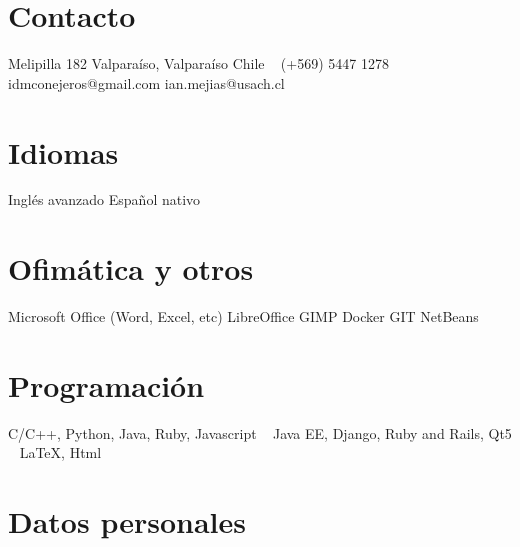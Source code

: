 \documentclass[espanol]{cv-style}
\begin{document}
\lastupdated


\begin{aside}
  \section{Contacto}
  Melipilla 182
  Valparaíso, Valparaíso
  Chile
  ~
  (+569) 5447 1278
  ~
  idmconejeros@gmail.com
  ian.mejias@usach.cl
  \section{Idiomas}
  Inglés avanzado
  Español nativo
  \section{Ofimática y otros}
  Microsoft Office (Word, Excel, etc)
  LibreOffice
  GIMP
  Docker
  GIT
  NetBeans
  \section{Programación}
  C/C++, Python, Java, Ruby, Javascript
  ~
  Java EE, Django, Ruby and Rails, Qt5
  ~
  \LaTeX{}, Html
\end{aside}


\section{Datos personales}
\begin{entrylist}
\end{entrylist}

\end{document}
